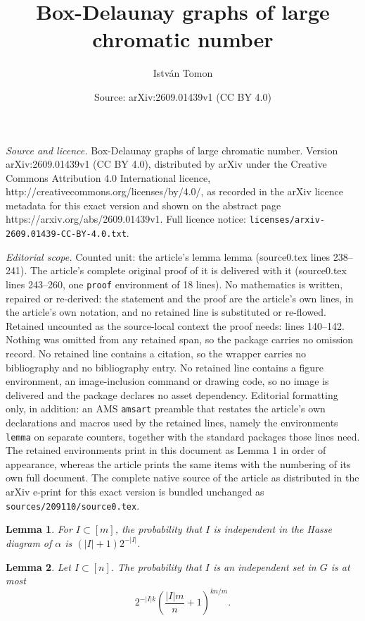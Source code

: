 \documentclass[10pt,a4paper]{amsart}
\title{Box-Delaunay graphs of large chromatic number}
\author{Istv\'an Tomon}
\date{Source: arXiv:2609.01439v1 (CC BY 4.0)}
\newtheorem{lemma}{Lemma}
\begin{document}
\maketitle

\noindent\emph{Source and licence.} Box-Delaunay graphs of large chromatic number. Version arXiv:2609.01439v1 (CC BY 4.0), distributed by arXiv under the Creative Commons Attribution 4.0 International licence, http://creativecommons.org/licenses/by/4.0/, as recorded in the arXiv licence metadata for this exact version and shown on the abstract page https://arxiv.org/abs/2609.01439v1. Full licence notice: \texttt{licenses/arxiv-2609.01439-CC-BY-4.0.txt}.\par\smallskip

\noindent\textit{Editorial scope.} Counted unit: the article's lemma lemma (source0.tex lines 238--241). The article's complete original proof of it is delivered with it (source0.tex lines 243--260, one \texttt{proof} environment of 18 lines). No mathematics is written, repaired or re-derived: the statement and the proof are the article's own lines, in the article's own notation, and no retained line is substituted or re-flowed.  Retained uncounted as the source-local context the proof needs: lines 140--142.  Nothing was omitted from any retained span, so the package carries no omission record.  No retained line contains a citation, so the wrapper carries no bibliography and no bibliography entry.  No retained line contains a figure environment, an image-inclusion command or drawing code, so no image is delivered and the package declares no asset dependency.  Editorial formatting only, in addition: an AMS \texttt{amsart} preamble that restates the article's own declarations and macros used by the retained lines, namely the environments \texttt{lemma} on separate counters, together with the standard packages those lines need.  The retained environments print in this document as Lemma 1 in order of appearance, whereas the article prints the same items with the numbering of its own full document.  The complete native source of the article as distributed in the arXiv e-print for this exact version is bundled unchanged as \texttt{sources/209110/source0.tex}.
\begin{lemma}\label{lemma:gadget}
For $I\subset [m]$, the probability that $I$ is independent in the Hasse diagram of $\alpha$ is  $(|I|+1)2^{-|I|}$.
\end{lemma}

\begin{lemma}
Let $I\subset [n]$. The probability that $I$ is an independent set in $G$ is at most 
$$2^{-|I|k}\left(\frac{|I|m}{n}+1\right)^{kn/m}.$$
\end{lemma}
\end{document}
